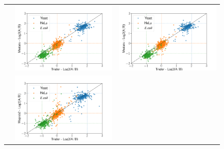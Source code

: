 \documentclass[11pt]{article}
\begin{document}
\begin{figure}[hbt]
\begin{tabular}{   >{\centering\arraybackslash} m{3cm} V V}
        {} & \includegraphics[width=\linewidth]{../../result/report_plots_pipeline/scatter_ID_triqler_vs_msstats.png}  
                & \includegraphics[width=\linewidth]{../../result/report_plots_pipeline/scatter_ID_triqler_vs_msstats.png} \\ 
        {} & \includegraphics[width=\linewidth]{../../result/report_plots_pipeline/scatter_ID_triqler_vs_msqrob2.png}  

\end{tabular}
\end{figure}
\end{document}
